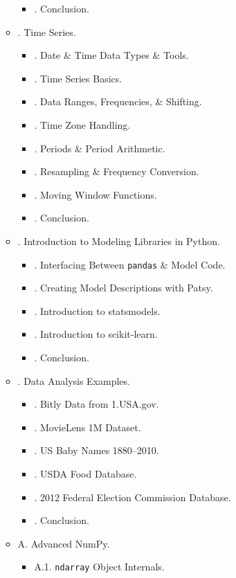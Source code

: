 \documentclass{article}
\begin{document}
\begin{enumerate}
\begin{itemize}
\begin{itemize}
			\item {. Conclusion.}
		\end{itemize}
		\item {. Time Series.}
		\begin{itemize}
			\item {. Date \& Time Data Types \& Tools.}
			\item {. Time Series Basics.}
			\item {. Data Ranges, Frequencies, \& Shifting.}
			\item {. Time Zone Handling.}
			\item {. Periods \& Period Arithmetic.}
			\item {. Resampling \& Frequency Conversion.}
			\item {. Moving Window Functions.}
			\item {. Conclusion.}
		\end{itemize}
		\item {. Introduction to Modeling Libraries in Python.}
		\begin{itemize}
			\item {. Interfacing Between {\tt pandas} \& Model Code.}
			\item {. Creating Model Descriptions with Patsy.}
			\item {. Introduction to statsmodels.}
			\item {. Introduction to scikit-learn.}
			\item {. Conclusion.}
		\end{itemize}
		\item {. Data Analysis Examples.}
		\begin{itemize}
			\item {. Bitly Data from 1.USA.gov.}
			\item {. MovieLens 1M Dataset.}
			\item {. US Baby Names 1880--2010.}
			\item {. USDA Food Database.}
			\item {. 2012 Federal Election Commission Database.}
			\item {. Conclusion.}
		\end{itemize}
		\item {\sf A. Advanced NumPy.}
		\begin{itemize}
			\item {\sf A.1. {\tt ndarray} Object Internals.}

\end{itemize}
\end{itemize}
\end{enumerate}
\end{document}
